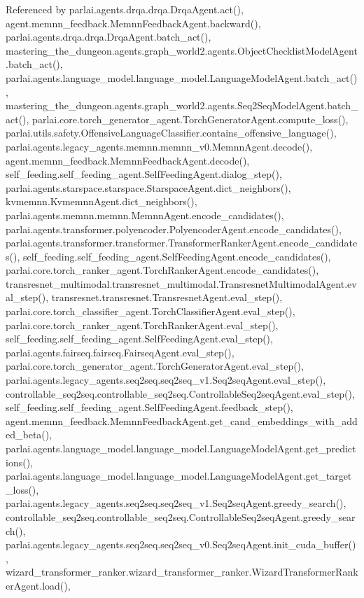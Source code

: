 Referenced by parlai.\+agents.\+drqa.\+drqa.\+Drqa\+Agent.\+act(), agent.\+memnn\+\_\+feedback.\+Memnn\+Feedback\+Agent.\+backward(), parlai.\+agents.\+drqa.\+drqa.\+Drqa\+Agent.\+batch\+\_\+act(), mastering\+\_\+the\+\_\+dungeon.\+agents.\+graph\+\_\+world2.\+agents.\+Object\+Checklist\+Model\+Agent.\+batch\+\_\+act(), parlai.\+agents.\+language\+\_\+model.\+language\+\_\+model.\+Language\+Model\+Agent.\+batch\+\_\+act(), mastering\+\_\+the\+\_\+dungeon.\+agents.\+graph\+\_\+world2.\+agents.\+Seq2\+Seq\+Model\+Agent.\+batch\+\_\+act(), parlai.\+core.\+torch\+\_\+generator\+\_\+agent.\+Torch\+Generator\+Agent.\+compute\+\_\+loss(), parlai.\+utils.\+safety.\+Offensive\+Language\+Classifier.\+contains\+\_\+offensive\+\_\+language(), parlai.\+agents.\+legacy\+\_\+agents.\+memnn.\+memnn\+\_\+v0.\+Memnn\+Agent.\+decode(), agent.\+memnn\+\_\+feedback.\+Memnn\+Feedback\+Agent.\+decode(), self\+\_\+feeding.\+self\+\_\+feeding\+\_\+agent.\+Self\+Feeding\+Agent.\+dialog\+\_\+step(), parlai.\+agents.\+starspace.\+starspace.\+Starspace\+Agent.\+dict\+\_\+neighbors(), kvmemnn.\+Kvmemnn\+Agent.\+dict\+\_\+neighbors(), parlai.\+agents.\+memnn.\+memnn.\+Memnn\+Agent.\+encode\+\_\+candidates(), parlai.\+agents.\+transformer.\+polyencoder.\+Polyencoder\+Agent.\+encode\+\_\+candidates(), parlai.\+agents.\+transformer.\+transformer.\+Transformer\+Ranker\+Agent.\+encode\+\_\+candidates(), self\+\_\+feeding.\+self\+\_\+feeding\+\_\+agent.\+Self\+Feeding\+Agent.\+encode\+\_\+candidates(), parlai.\+core.\+torch\+\_\+ranker\+\_\+agent.\+Torch\+Ranker\+Agent.\+encode\+\_\+candidates(), transresnet\+\_\+multimodal.\+transresnet\+\_\+multimodal.\+Transresnet\+Multimodal\+Agent.\+eval\+\_\+step(), transresnet.\+transresnet.\+Transresnet\+Agent.\+eval\+\_\+step(), parlai.\+core.\+torch\+\_\+classifier\+\_\+agent.\+Torch\+Classifier\+Agent.\+eval\+\_\+step(), parlai.\+core.\+torch\+\_\+ranker\+\_\+agent.\+Torch\+Ranker\+Agent.\+eval\+\_\+step(), self\+\_\+feeding.\+self\+\_\+feeding\+\_\+agent.\+Self\+Feeding\+Agent.\+eval\+\_\+step(), parlai.\+agents.\+fairseq.\+fairseq.\+Fairseq\+Agent.\+eval\+\_\+step(), parlai.\+core.\+torch\+\_\+generator\+\_\+agent.\+Torch\+Generator\+Agent.\+eval\+\_\+step(), parlai.\+agents.\+legacy\+\_\+agents.\+seq2seq.\+seq2seq\+\_\+v1.\+Seq2seq\+Agent.\+eval\+\_\+step(), controllable\+\_\+seq2seq.\+controllable\+\_\+seq2seq.\+Controllable\+Seq2seq\+Agent.\+eval\+\_\+step(), self\+\_\+feeding.\+self\+\_\+feeding\+\_\+agent.\+Self\+Feeding\+Agent.\+feedback\+\_\+step(), agent.\+memnn\+\_\+feedback.\+Memnn\+Feedback\+Agent.\+get\+\_\+cand\+\_\+embeddings\+\_\+with\+\_\+added\+\_\+beta(), parlai.\+agents.\+language\+\_\+model.\+language\+\_\+model.\+Language\+Model\+Agent.\+get\+\_\+predictions(), parlai.\+agents.\+language\+\_\+model.\+language\+\_\+model.\+Language\+Model\+Agent.\+get\+\_\+target\+\_\+loss(), parlai.\+agents.\+legacy\+\_\+agents.\+seq2seq.\+seq2seq\+\_\+v1.\+Seq2seq\+Agent.\+greedy\+\_\+search(), controllable\+\_\+seq2seq.\+controllable\+\_\+seq2seq.\+Controllable\+Seq2seq\+Agent.\+greedy\+\_\+search(), parlai.\+agents.\+legacy\+\_\+agents.\+seq2seq.\+seq2seq\+\_\+v0.\+Seq2seq\+Agent.\+init\+\_\+cuda\+\_\+buffer(), wizard\+\_\+transformer\+\_\+ranker.\+wizard\+\_\+transformer\+\_\+ranker.\+Wizard\+Transformer\+Ranker\+Agent.\+load(), 